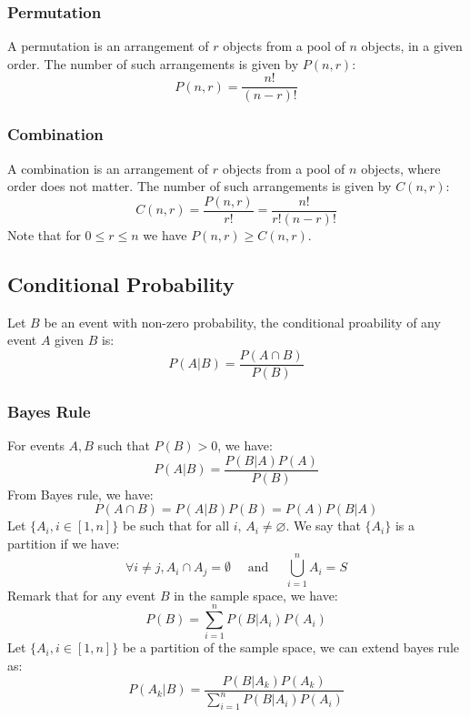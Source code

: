 \documentclass[twoside,twocolumn]{article}
\begin{document}
\subsubsection{Permutation}
A permutation is an arrangement of $r$ objects from a pool of $n$ objects, in
a given order. The number of such arrangements is given by $P(n, r)$:
\begin{equation} P(n, r) = \frac{n!}{(n-r)!} \end{equation}
\subsubsection{Combination}
A combination is an arrangement of $r$ objects from a pool of $n$ objects, where
order does not matter. The number of such arrangements is given by $C(n, r)$:
\begin{equation} C(n, r) = \frac{P(n, r)}{r!} = \frac{n!}{r! (n-r)!} \end{equation}
Note that for $0 \leq r \leq n$ we have $P(n, r) \geq C(n, r)$.
\subsection{Conditional Probability}
Let $B$ be an event with non-zero probability, the conditional proability of
any event $A$ given $B$ is:
\begin{equation} P(A | B) = \frac{P(A \cap B)}{P(B)} \end{equation}
\subsubsection{Bayes Rule}
For events $A, B$ such that $P(B) > 0$, we have:
\begin{equation} P(A | B) = \frac{P(B|A) P(A)}{P(B)} \end{equation}
From Bayes rule, we have:
\begin{equation} P(A \cap B) = P(A|B)P(B) = P(A)P(B|A) \end{equation}
Let $\{ A_i, i \in [1, n] \}$ be such that for all $i$, $A_i \not= \varnothing$.
We say that $\{A_i\}$ is a partition if we have:
\begin{equation} \forall i\neq j, A_i\cap A_j=\emptyset\quad\mbox{ and }\quad\bigcup_{i=1}^nA_i=S \end{equation}
Remark that for any event $B$ in the sample space, we have:
\begin{equation} P(B)=\sum_{i=1}^n P(B|A_i)P(A_i) \end{equation}
Let $\{ A_i, i \in [1, n] \}$ be a partition of the sample space, we can
extend bayes rule as:
\begin{equation} P(A_k|B)=\frac{P(B|A_k)P(A_k)}{\displaystyle\sum_{i=1}^nP(B|A_i)P(A_i)} \end{equation}
\end{document}
